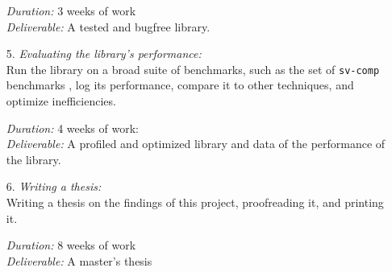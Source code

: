 \begin{itemize}
			  \textsl{Duration:} 3 weeks of work \\
			  \textsl{Deliverable:} A tested and bugfree \qvasr library.

	\item[5.] \textsl{Evaluating the library's performance:} \\
               Run the library on a broad suite of benchmarks, such as the set of \texttt{sv-comp} benchmarks \cite{svcomp}, log its performance, compare it to other techniques, and optimize inefficiencies.

			  \textsl{Duration:} 4 weeks of work: \\
			  \textsl{Deliverable:} A profiled and optimized library and data of the performance of the \qvasr library.

	\item[6.] \textsl{Writing a thesis:} \\
              Writing a thesis on the findings of this project, proofreading it, and printing it.

			  \textsl{Duration:} 8 weeks of work \\
			  \textsl{Deliverable:}	A master's thesis
\end{itemize}
